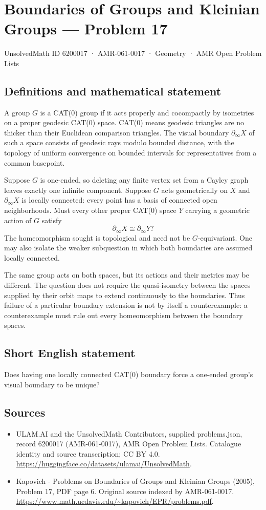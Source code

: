 \documentclass[11pt,a4paper]{article}
\begin{document}
\section*{Boundaries of Groups and Kleinian Groups — Problem 17}\label{6200017}
{\small UnsolvedMath ID 6200017 · AMR-061-0017 · Geometry · AMR Open Problem Lists}
\subsection{Definitions and mathematical statement}
A group $G$ is a CAT(0) group if it acts properly and cocompactly by isometries on a proper geodesic CAT(0) space. CAT(0) means geodesic triangles are no thicker than their Euclidean comparison triangles. The visual boundary $\partial_\infty X$ of such a space consists of geodesic rays modulo bounded distance, with the topology of uniform convergence on bounded intervals for representatives from a common basepoint.

Suppose $G$ is one-ended, so deleting any finite vertex set from a Cayley graph leaves exactly one infinite component. Suppose $G$ acts geometrically on $X$ and $\partial_\infty X$ is locally connected: every point has a basis of connected open neighborhoods. Must every other proper CAT(0) space $Y$ carrying a geometric action of $G$ satisfy
\[
 \partial_\infty X\cong\partial_\infty Y?
\]
The homeomorphism sought is topological and need not be $G$-equivariant. One may also isolate the weaker subquestion in which both boundaries are assumed locally connected.

The same group acts on both spaces, but its actions and their metrics may be different. The question does not require the quasi-isometry between the spaces supplied by their orbit maps to extend continuously to the boundaries. Thus failure of a particular boundary extension is not by itself a counterexample: a counterexample must rule out every homeomorphism between the boundary spaces.
\subsection{Short English statement}
Does having one locally connected CAT(0) boundary force a one-ended group’s visual boundary to be unique?
\subsection{Sources}
\begin{itemize}
\item[S1] ULAM.AI and the UnsolvedMath Contributors, supplied problems.json, record 6200017 (AMR-061-0017), AMR Open Problem Lists. Catalogue identity and source transcription; CC BY 4.0.
\url{https://huggingface.co/datasets/ulamai/UnsolvedMath}.
\item[S2] Kapovich - Problems on Boundaries of Groups and Kleinian Groups (2005), Problem 17, PDF page 6. Original source indexed by AMR-061-0017.
\url{https://www.math.ucdavis.edu/~kapovich/EPR/problems.pdf}.
\end{itemize}
\end{document}
